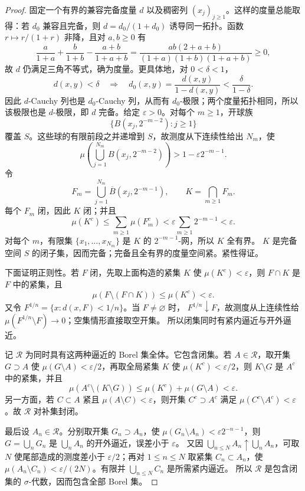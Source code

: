\begin{proof}
固定一个有界的兼容完备度量 $d$ 以及稠密列 $(x_j)_{j\ge1}$。这样的度量总能取得：若
$d_0$ 兼容且完备，则 $d=d_0/(1+d_0)$ 诱导同一拓扑。函数
$r\mapsto r/(1+r)$ 非降，且对 $a,b\geq0$ 有
\[
 \frac{a}{1+a}+\frac{b}{1+b}-\frac{a+b}{1+a+b}
 =\frac{ab(2+a+b)}{(1+a)(1+b)(1+a+b)}\geq0,
\]
故 $d$ 仍满足三角不等式，确为度量。更具体地，对 $0<\delta<1$，
\[
 d(x,y)<\delta
 \quad\Longrightarrow\quad
 d_0(x,y)=\frac{d(x,y)}{1-d(x,y)}<\frac{\delta}{1-\delta}.
\]
因此 $d$-Cauchy 列也是 $d_0$-Cauchy 列，从而有 $d_0$-极限；两个度量拓扑相同，所以该极限也是
$d$-极限，即 $d$ 完备。给定 $\varepsilon>0$。对每个
$m\ge1$，开球族
\[
 \{B(x_j,2^{-m-2}):j\ge1\}
\]
覆盖 $S$。这些球的有限前段之并递增到 $S$，故测度从下连续性给出 $N_m$，使
\[
 \mu\left(\bigcup_{j=1}^{N_m}B(x_j,2^{-m-2})\right)
 >1-\varepsilon2^{-m-1}.
\]
令
\[
 F_m=\bigcup_{j=1}^{N_m}\overline B(x_j,2^{-m-1}),
 \qquad K=\bigcap_{m\ge1}F_m.
\]
每个 $F_m$ 闭，因此 $K$ 闭；并且
\[
 \mu(K^c)\le\sum_{m\ge1}\mu(F_m^c)
 <\varepsilon\sum_{m\ge1}2^{-m-1}<\varepsilon.
\]
对每个 $m$，有限集 $\{x_1,\ldots,x_{N_m}\}$ 是 $K$ 的 $2^{-m-1}$-网，所以 $K$ 全有界。
$K$ 是完备空间 $S$ 的闭子集，因而完备；完备且全有界的度量空间紧。紧性得证。

下面证明正则性。若 $F$ 闭，先取上面构造的紧集 $K$ 使 $\mu(K^c)<\varepsilon$，则
$F\cap K$ 是 $F$ 中的紧集，且
\[
 \mu(F\setminus(F\cap K))\le\mu(K^c)<\varepsilon.
\]
又令 $F^{1/n}=\{x:d(x,F)<1/n\}$。当 $F\ne\varnothing$ 时，
$F^{1/n}\downarrow F$，故测度从上连续性给 $\mu(F^{1/n}\setminus F)\to0$；空集情形直接取空开集。
所以闭集同时有紧内逼近与开外逼近。

记 $\mathcal R$ 为同时具有这两种逼近的 Borel 集全体。它包含闭集。若 $A\in\mathcal R$，取开集
$G\supset A$ 使 $\mu(G\setminus A)<\varepsilon/2$，再取全局紧集 $K$ 使
$\mu(K^c)<\varepsilon/2$，则 $K\setminus G$ 是 $A^c$ 中的紧集，并且
\[
 \mu(A^c\setminus(K\setminus G))
 \le\mu(K^c)+\mu(G\setminus A)<\varepsilon.
\]
另一方面，若 $C\subset A$ 紧且 $\mu(A\setminus C)<\varepsilon$，则开集
$C^c\supset A^c$ 满足 $\mu(C^c\setminus A^c)<\varepsilon$。故 $\mathcal R$ 对补集封闭。

最后设 $A_n\in\mathcal R$。分别取开集 $G_n\supset A_n$，使
$\mu(G_n\setminus A_n)<\varepsilon2^{-n-1}$，则
$G=\bigcup_nG_n$ 是 $\bigcup_nA_n$ 的开外逼近，误差小于 $\varepsilon$。
又因 $\bigcup_{n\le N}A_n\uparrow\bigcup_nA_n$，可取 $N$ 使尾部造成的测度差小于
$\varepsilon/2$；再对 $1\le n\le N$ 取紧集 $C_n\subset A_n$，使
$\mu(A_n\setminus C_n)<\varepsilon/(2N)$。有限并 $\bigcup_{n\le N}C_n$ 是所需紧内逼近。
所以 $\mathcal R$ 是包含闭集的 $\sigma$-代数，因而包含全部 Borel 集。
\end{proof}


